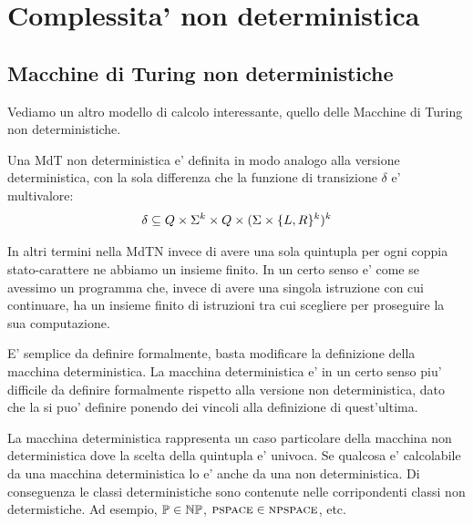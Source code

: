 %
%
%
%
\chapter{Complessita' non deterministica}

\section{Macchine di Turing non deterministiche}

Vediamo un altro modello di calcolo interessante, quello delle Macchine di Turing non
deterministiche.

Una MdT non deterministica e' definita in modo analogo alla versione deterministica, con la sola
differenza che la funzione di transizione $\delta$ e' multivalore:
\begin{equation*}
    \delta \subseteq Q \times \Sigma^{k} \times Q \times (\Sigma \times \{L,R\}^{k})^{k}
\end{equation*}

In altri termini nella MdTN invece di avere una sola quintupla per ogni coppia stato-carattere ne
abbiamo un insieme finito. In un certo senso e' come se avessimo un programma che, invece di avere
una singola istruzione con cui continuare, ha un insieme finito di istruzioni tra cui scegliere per
proseguire la sua computazione.

E' semplice da definire formalmente, basta modificare la definizione della macchina deterministica.
La macchina deterministica e' in un certo senso piu' difficile da definire formalmente rispetto alla
versione non deterministica, dato che la si puo' definire ponendo dei vincoli alla definizione di
quest'ultima.

La macchina deterministica rappresenta un caso particolare della macchina non deterministica dove la
scelta della quintupla e' univoca. Se qualcosa e' calcolabile da una macchina deterministica lo e'
anche da una non deterministica. Di conseguenza le classi deterministiche sono contenute nelle
corripondenti classi non determistiche. Ad esempio, $\mathbb{P} \in \mathbb{NP}$, $\textsc{pspace} \in \textsc{npspace}$,
etc.

